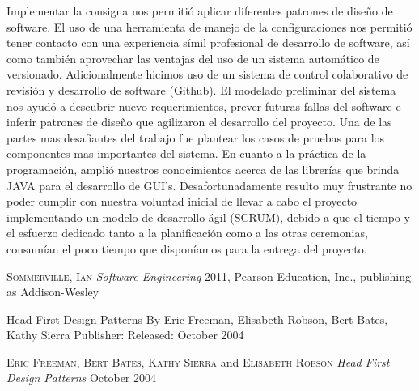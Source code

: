 \documentclass[10pt]{article} %
\begin{document}
Implementar la consigna nos permitió aplicar diferentes patrones de diseño de software.
El uso de una herramienta de manejo de la configuraciones nos permitió tener contacto con una experiencia símil profesional de desarrollo de software, así como también aprovechar las ventajas del uso de un sistema automático de versionado. Adicionalmente hicimos uso de un sistema de control colaborativo de revisión y desarrollo de software (Github).
El modelado preliminar del sistema nos ayudó a descubrir nuevo requerimientos, prever futuras fallas del software e inferir patrones de diseño que agilizaron el desarrollo del proyecto.
Una de las partes mas desafiantes del trabajo fue plantear los casos de pruebas para los componentes mas importantes del sistema.
En cuanto a la práctica de la programación, amplió nuestros conocimientos acerca de las librerías que brinda JAVA para el desarrollo de GUI's.
Desafortunadamente resulto muy frustrante no poder cumplir con nuestra voluntad inicial de llevar a cabo el proyecto implementando un modelo de desarrollo ágil (SCRUM), debido a que el tiempo y el esfuerzo dedicado tanto a la planificación como a las otras ceremonias, consumían el poco tiempo que disponíamos para la entrega del proyecto.



\begin{thebibliography}{99} %

 \textsc{Sommerville, Ian}
\textit{Software Engineering}
2011, Pearson Education, Inc., publishing as Addison-Wesley

Head First Design Patterns
By Eric Freeman, Elisabeth Robson, Bert Bates, Kathy Sierra
Publisher:
Released: October 2004

 \textsc{Eric Freeman}, \textsc{Bert Bates}, \textsc{Kathy Sierra} and \textsc{Elisabeth Robson}
\textit{Head First Design Patterns}
October 2004


\end{thebibliography}

\end{document}
